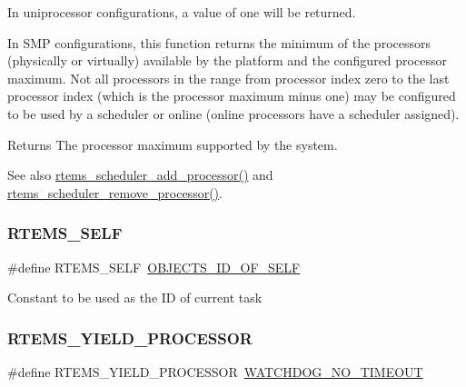 In uniprocessor configurations, a value of one will be returned.

In S\+MP configurations, this function returns the minimum of the processors (physically or virtually) available by the platform and the configured processor maximum. Not all processors in the range from processor index zero to the last processor index (which is the processor maximum minus one) may be configured to be used by a scheduler or online (online processors have a scheduler assigned).

\begin{DoxyReturn}{Returns}
The processor maximum supported by the system.
\end{DoxyReturn}
\begin{DoxySeeAlso}{See also}
\mbox{\hyperlink{group__ClassicTasks_ga3dcba5bc6f402c4fa35f0dc91dd1e3fd}{rtems\+\_\+scheduler\+\_\+add\+\_\+processor()}} and \mbox{\hyperlink{group__ClassicTasks_ga033f8f1ec58d5e0f91dbf69f0486b441}{rtems\+\_\+scheduler\+\_\+remove\+\_\+processor()}}. 
\end{DoxySeeAlso}
\mbox{\label{group__ClassicTasks_ga8a1cff22846976c3f4df8a8d50fdc4dc}} 
\subsubsection{\texorpdfstring{RTEMS\_SELF}{RTEMS\_SELF}}
{\footnotesize\ttfamily \#define R\+T\+E\+M\+S\+\_\+\+S\+E\+LF~\mbox{\hyperlink{group__RTEMSScoreObject_ga2454d6c322916168e6924f5ff26ab393}{O\+B\+J\+E\+C\+T\+S\+\_\+\+I\+D\+\_\+\+O\+F\+\_\+\+S\+E\+LF}}}

Constant to be used as the ID of current task \mbox{\label{group__ClassicTasks_gab8389262bfd555f0b1515a568bc97b07}} 
\subsubsection{\texorpdfstring{RTEMS\_YIELD\_PROCESSOR}{RTEMS\_YIELD\_PROCESSOR}}
{\footnotesize\ttfamily \#define R\+T\+E\+M\+S\+\_\+\+Y\+I\+E\+L\+D\+\_\+\+P\+R\+O\+C\+E\+S\+S\+OR~\mbox{\hyperlink{group__RTEMSScoreWatchdog_gaa7a11d3dcb3ba512032421888d16b327}{W\+A\+T\+C\+H\+D\+O\+G\+\_\+\+N\+O\+\_\+\+T\+I\+M\+E\+O\+UT}}}

